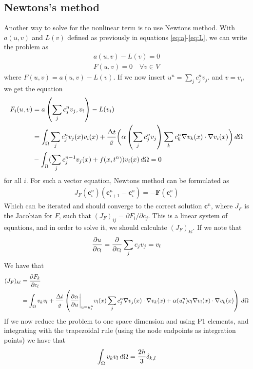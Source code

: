 \documentclass[12pt]{article}
\begin{document}
\subsection{Newtons's method}
Another way to solve for the nonlinear term is to use Newtons method. With $a(u,v)$ and $L(v)$ defined as previously in equations \eqref{eq:a}-\eqref{eq:L}, we can write the problem as 
\begin{align}
 a(u,v) - L(v) = 0 \\
 F(u,v) = 0 \quad \forall v \in V
\end{align}
where $F(u,v) = a(u,v)- L(v)$. If we now insert $u^n = \sum_j c_j^n v_j$. and $v = v_i$, we get the equation
\begin{align}
 F_i(u,v) & = a\left(\sum_j c_j^n v_j, v_i\right) - L(v_i) \\
 & = \int_\Omega  \sum_j c_j^n v_j (x)v_i(x) + {\Delta t \over \varrho}\bigg( \alpha\left(\sum_j c^{n}_j v_j\right)   \sum_k c_k^n \nabla v_k(x)\cdot \nabla v_i(x) \bigg)\, d\Omega  \\
  &-\int_\Omega (\sum_j c_j^{n-1} v_j(x) + f(x,t^n)) v_i(x) \, d\Omega = 0
\end{align}
for all $i$. For such a vector equation, Newtons method can be formulated as 
\begin{align}
 J_F(\textbf{c}_i^n)(\textbf{c}_{i+1}^n - \textbf{c}_{i}^n) = -\textbf{F}(\textbf{c}_i^n)
\end{align}
Which can be iterated and should converge to the correct solution $\textbf{c}^n$, where $J_F$ is the Jacobian for $F$, such that $(J_F)_{ij} = \partial F_i / \partial c_j$. This is a linear system of equations, and in order to solve it, we should calculate $(J_F)_{kl}$. If we note that 
\begin{equation}
{ \partial u \over \partial c_l} = {\partial \over \partial c_l} \sum_j c_j v_j = v_l
\end{equation}
We have that 
\begin{align}
 (J_F)_{kl} & = { \partial F_k \over \partial c_l } \\
 & = \int_\Omega v_k v_l + {\Delta t \over \varrho} \left( {\partial \alpha \over \partial u} \bigg|_{u = u^{n}_i} v_l(x)\sum_j c_j^n \nabla v_j(x)\cdot \nabla v_k(x)  + \alpha(u_i^n) c_l \nabla v_l(x) \cdot \nabla v_k(x) \right) \, d\Omega
\end{align}
If we now reduce the problem to one space dimension and using P1 elements, and integrating with the trapezoidal rule (using the node endpoints as integration points) we have that 
\begin{align}
 \int_\Omega v_k v_l \, d\Omega = {2h \over 3}\delta_{k,l}%
\end{align}
\end{document}
